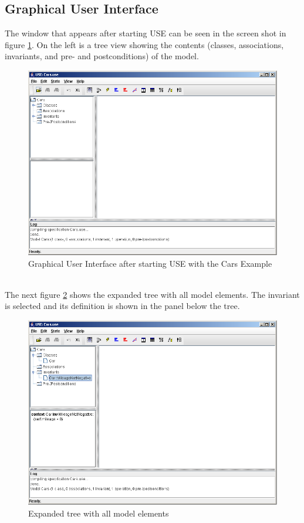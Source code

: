 \documentclass[a4paper,titlepage,oneside,final]{scrreprt} %
\begin{document}
\subsection{Graphical User Interface}
The window that appears after starting USE can
be seen in the screen shot in figure \ref{fig:StartCars}.
On the left is a tree view showing the contents (classes, associations,
invariants, and pre- and postconditions) of the model.\\
\begin{figure}[ht]
\centering
\includegraphics[scale=0.5]{Screenshots/GUI/StartCars.png}
\caption{Graphical User Interface after starting USE with the Cars Example}
\label{fig:StartCars}
\end{figure}\\
The next figure \ref{fig:CarsInv}
shows the expanded tree with all model elements. The invariant
is selected and its definition is shown in the panel below the tree.\\
\begin{figure}[ht]
\centering
\includegraphics[scale=0.5]{Screenshots/GUI/CarsInv.png}
\caption{Expanded tree with all model elements}
\label{fig:CarsInv}
\end{figure}\\
\end{document}
